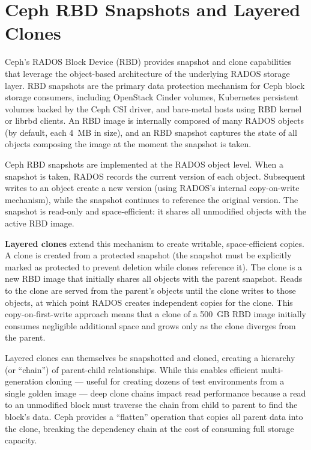 \section{Ceph RBD Snapshots and Layered Clones}

Ceph's RADOS Block Device (RBD) provides snapshot and clone capabilities that leverage the object-based architecture of the underlying RADOS storage layer. RBD snapshots are the primary data protection mechanism for Ceph block storage consumers, including OpenStack Cinder volumes, Kubernetes persistent volumes backed by the Ceph CSI driver, and bare-metal hosts using RBD kernel or librbd clients. An RBD image is internally composed of many RADOS objects (by default, each 4~MB in size), and an RBD snapshot captures the state of all objects composing the image at the moment the snapshot is taken.

Ceph RBD snapshots are implemented at the RADOS object level. When a snapshot is taken, RADOS records the current version of each object. Subsequent writes to an object create a new version (using RADOS's internal copy-on-write mechanism), while the snapshot continues to reference the original version. The snapshot is read-only and space-efficient: it shares all unmodified objects with the active RBD image.

\textbf{Layered clones} extend this mechanism to create writable, space-efficient copies. A clone is created from a protected snapshot (the snapshot must be explicitly marked as protected to prevent deletion while clones reference it). The clone is a new RBD image that initially shares all objects with the parent snapshot. Reads to the clone are served from the parent's objects until the clone writes to those objects, at which point RADOS creates independent copies for the clone. This copy-on-first-write approach means that a clone of a 500~GB RBD image initially consumes negligible additional space and grows only as the clone diverges from the parent.

Layered clones can themselves be snapshotted and cloned, creating a hierarchy (or ``chain'') of parent-child relationships. While this enables efficient multi-generation cloning --- useful for creating dozens of test environments from a single golden image --- deep clone chains impact read performance because a read to an unmodified block must traverse the chain from child to parent to find the block's data. Ceph provides a ``flatten'' operation that copies all parent data into the clone, breaking the dependency chain at the cost of consuming full storage capacity.

